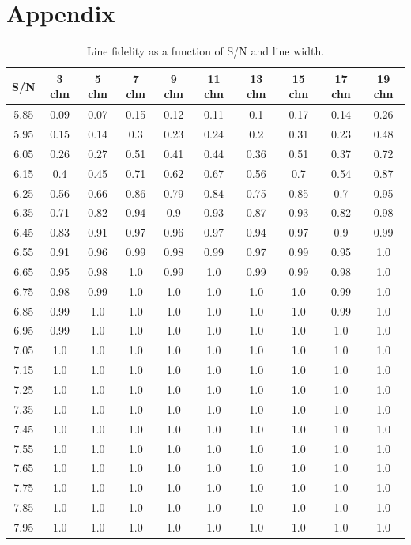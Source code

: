 \chapter{Appendix}

\begin{table}
\centering
\caption{Line fidelity as a function of S/N and line width.}
\begin{tabular}{cccccccccc}
\hline
S/N & 3 chn & 5 chn & 7 chn & 9 chn & 11 chn & 13 chn & 15 chn & 17 chn & 19 chn \\
\hline
5.85 & 0.09 & 0.07 & 0.15 & 0.12 & 0.11 & 0.1 & 0.17 & 0.14 & 0.26 \\
5.95 & 0.15 & 0.14 & 0.3 & 0.23 & 0.24 & 0.2 & 0.31 & 0.23 & 0.48 \\
6.05 & 0.26 & 0.27 & 0.51 & 0.41 & 0.44 & 0.36 & 0.51 & 0.37 & 0.72 \\
6.15 & 0.4 & 0.45 & 0.71 & 0.62 & 0.67 & 0.56 & 0.7 & 0.54 & 0.87 \\
6.25 & 0.56 & 0.66 & 0.86 & 0.79 & 0.84 & 0.75 & 0.85 & 0.7 & 0.95 \\
6.35 & 0.71 & 0.82 & 0.94 & 0.9 & 0.93 & 0.87 & 0.93 & 0.82 & 0.98 \\
6.45 & 0.83 & 0.91 & 0.97 & 0.96 & 0.97 & 0.94 & 0.97 & 0.9 & 0.99 \\
6.55 & 0.91 & 0.96 & 0.99 & 0.98 & 0.99 & 0.97 & 0.99 & 0.95 & 1.0 \\
6.65 & 0.95 & 0.98 & 1.0 & 0.99 & 1.0 & 0.99 & 0.99 & 0.98 & 1.0 \\
6.75 & 0.98 & 0.99 & 1.0 & 1.0 & 1.0 & 1.0 & 1.0 & 0.99 & 1.0 \\
6.85 & 0.99 & 1.0 & 1.0 & 1.0 & 1.0 & 1.0 & 1.0 & 0.99 & 1.0 \\
6.95 & 0.99 & 1.0 & 1.0 & 1.0 & 1.0 & 1.0 & 1.0 & 1.0 & 1.0 \\
7.05 & 1.0 & 1.0 & 1.0 & 1.0 & 1.0 & 1.0 & 1.0 & 1.0 & 1.0 \\
7.15 & 1.0 & 1.0 & 1.0 & 1.0 & 1.0 & 1.0 & 1.0 & 1.0 & 1.0 \\
7.25 & 1.0 & 1.0 & 1.0 & 1.0 & 1.0 & 1.0 & 1.0 & 1.0 & 1.0 \\
7.35 & 1.0 & 1.0 & 1.0 & 1.0 & 1.0 & 1.0 & 1.0 & 1.0 & 1.0 \\
7.45 & 1.0 & 1.0 & 1.0 & 1.0 & 1.0 & 1.0 & 1.0 & 1.0 & 1.0 \\
7.55 & 1.0 & 1.0 & 1.0 & 1.0 & 1.0 & 1.0 & 1.0 & 1.0 & 1.0 \\
7.65 & 1.0 & 1.0 & 1.0 & 1.0 & 1.0 & 1.0 & 1.0 & 1.0 & 1.0 \\
7.75 & 1.0 & 1.0 & 1.0 & 1.0 & 1.0 & 1.0 & 1.0 & 1.0 & 1.0 \\
7.85 & 1.0 & 1.0 & 1.0 & 1.0 & 1.0 & 1.0 & 1.0 & 1.0 & 1.0 \\
7.95 & 1.0 & 1.0 & 1.0 & 1.0 & 1.0 & 1.0 & 1.0 & 1.0 & 1.0 \\
\end{tabular}
\end{table}\label{table:Fid_Table}

